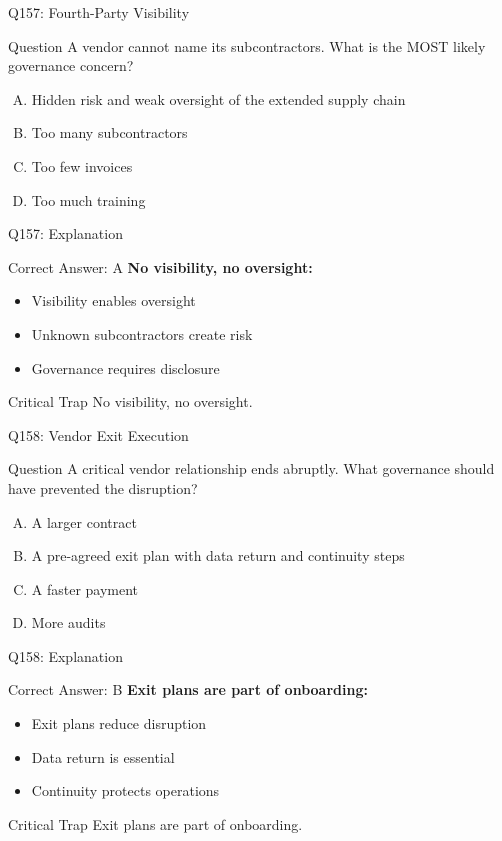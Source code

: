 \documentclass{beamer}
\begin{document}
	\begin{frame}{Q157: Fourth-Party Visibility}
		\begin{block}{Question}
			A vendor cannot name its subcontractors. What is the MOST likely governance concern?
		\end{block}
		\begin{enumerate}[(A)]
			\item Hidden risk and weak oversight of the extended supply chain
			\item Too many subcontractors
			\item Too few invoices
			\item Too much training
		\end{enumerate}
	\end{frame}
	
	\begin{frame}{Q157: Explanation}
		\begin{block}{Correct Answer: A}
			\textbf{No visibility, no oversight:}
			\begin{itemize}
				\item Visibility enables oversight
				\item Unknown subcontractors create risk
				\item Governance requires disclosure
			\end{itemize}
		\end{block}
		\begin{alertblock}{Critical Trap}
			No visibility, no oversight.
		\end{alertblock}
	\end{frame}
	
	\begin{frame}{Q158: Vendor Exit Execution}
		\begin{block}{Question}
			A critical vendor relationship ends abruptly. What governance should have prevented the disruption?
		\end{block}
		\begin{enumerate}[(A)]
			\item A larger contract
			\item A pre-agreed exit plan with data return and continuity steps
			\item A faster payment
			\item More audits
		\end{enumerate}
	\end{frame}
	
	\begin{frame}{Q158: Explanation}
		\begin{block}{Correct Answer: B}
			\textbf{Exit plans are part of onboarding:}
			\begin{itemize}
				\item Exit plans reduce disruption
				\item Data return is essential
				\item Continuity protects operations
			\end{itemize}
		\end{block}
		\begin{alertblock}{Critical Trap}
			Exit plans are part of onboarding.
		\end{alertblock}
	\end{frame}
	
\end{document}
